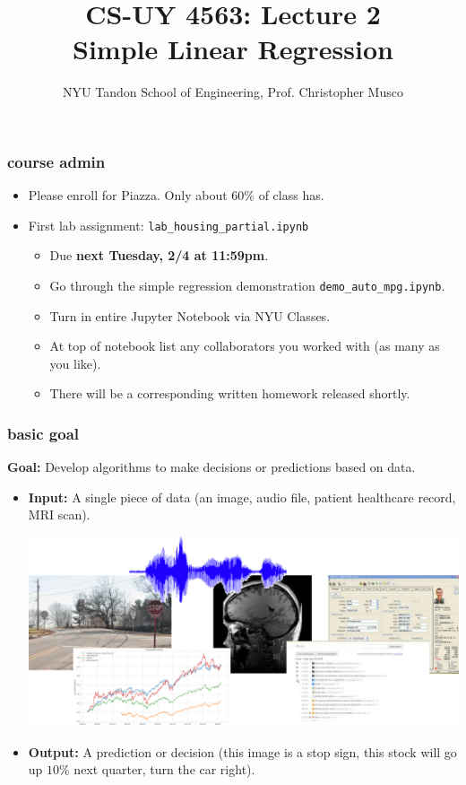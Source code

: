 \documentclass[handout,compress]{beamer}
\title{CS-UY 4563: Lecture 2 \\ Simple Linear Regression}
\author{NYU Tandon School of Engineering, Prof. Christopher Musco}
\date{}
\begin{document}
\begin{frame}
	\titlepage 
\end{frame}

\begin{frame}
	\frametitle{course admin}
	\begin{itemize}
		\item Please enroll for Piazza. Only about $60\%$ of class has. 
		\item First lab assignment: \texttt{lab\_housing\_partial.ipynb} 
		\begin{itemize}
			\item Due \textbf{next Tuesday, 2/4 at 11:59pm}.
			\item Go through the simple regression demonstration \texttt{demo\_auto\_mpg.ipynb}.
			\item Turn in entire Jupyter Notebook via NYU Classes. 
			\item At top of notebook list any collaborators you worked with (as many as you like).
			\item There will be a corresponding written homework released shortly.
		\end{itemize}
	\end{itemize}
	\end{frame}

\begin{frame}
	\frametitle{basic goal}
	\textbf{Goal:} Develop algorithms to make decisions or predictions based on data.
	\begin{itemize}
		\item \textbf{Input:} A single piece of data (an image, audio file, patient healthcare record, MRI scan).
		\begin{center}
		\includegraphics[width=.6\textwidth]{data_examples.png}
		\end{center}
		\item \textbf{Output:} A prediction or decision (this image is a stop sign, this stock will go up $10\%$ next quarter, turn the car right).
	\end{itemize}
\end{frame}
\end{document}
